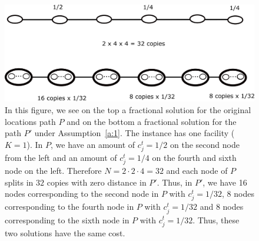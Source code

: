 \begin{figure}
    \centering
    \includegraphics[scale=0.14]{chapters/previous_work/general.png}
    \caption{In this figure, we see on the top a fractional solution for the original locations path $P$ and on the bottom a fractional solution for the path $P'$ under Assumption~\ref{a:1}. The instance has one facility ($K=1$). In $P$, we have an amount of $c_j^t=1/2$ on the second node from the left and an amount of $c_j^t=1/4$ on the fourth and sixth node on the left. Therefore $N=2 \cdot 2 \cdot 4=32$ and each node of $P$ splits in $32$ copies with zero distance in $P'$. Thus, in $P'$, we have 16 nodes corresponding to the second node in $P$ with $c_j^t=1/32$, $8$ nodes corresponding to the fourth node in $P$ with $c_j^t=1/32$ and $8$ nodes corresponding to the sixth node in $P$ with $c_j^t=1/32$. Thus, these two solutions have the same cost.
    }
    \label{fig:general}
\end{figure}


